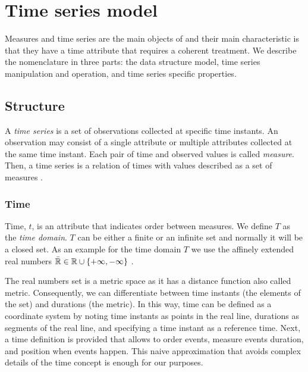 

\section{Time series model}
\label{sec:model:TSMS}



Measures and time series are the main objects of  and their
main characteristic is that they have a time attribute that requires a
coherent treatment. We describe the  nomenclature in three
parts: the data structure model, time series manipulation and
operation, and time series specific properties.



\subsection{Structure}


A \emph{time series} is a set of observations collected at specific
time instants. An observation may consist of a single attribute or
multiple attributes collected at the same time instant.  Each pair of
time and observed values is called \emph{measure}. Then, a time series
is a relation of times with values described as a set of measures .





\subsubsection{Time}

Time, $t$, is an attribute that indicates order between measures. We define
$T$ as the \emph{time domain}. $T$ can be either a finite or an infinite set
and normally it will be a closed set. As an example for the time
domain $T$ we use the affinely extended real numbers $\bar{\mathbb{R}} \in \mathbb{R} \cup
\{+\infty,-\infty\}$ \cite{cantrell:extendedreal}.

The real numbers set is a metric space as it has a distance function
also called metric. Consequently, we can differentiate between time
instants (the elements of the set) and durations (the metric). In this
way, time can be defined as a coordinate system
\cite{iep:time-supplement,kopetz11:realtime} by noting time instants
as points in the real line, durations as segments of the real line,
and specifying a time instant as a reference time. Next, a time
definition is provided that allows to order events, measure events
duration, and position when events happen. This naive approximation
that avoids complex details of the time concept is enough for our
purposes.

